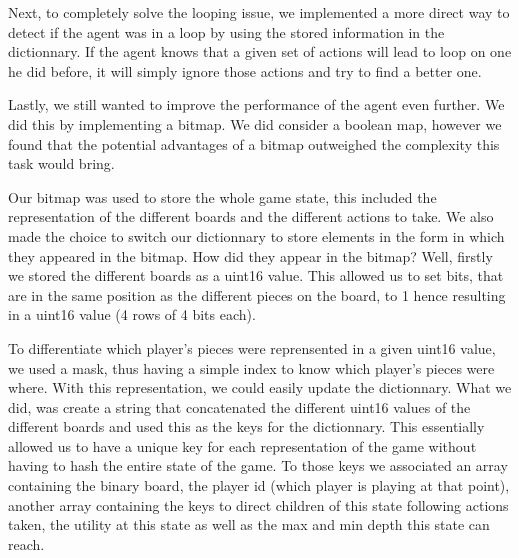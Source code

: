 \documentclass[11pt,a4paper]{report}
\begin{document}
\begin{answers}[21cm]
    Next, to completely solve the looping issue, we implemented a more direct way to detect if the agent was in a loop by using the 
    stored information in the dictionnary. If the agent knows that a given set of actions will lead to loop on one he did before,
    it will simply ignore those actions and try to find a better one. 

    Lastly, we still wanted to improve the performance of the agent even further. We did this by implementing a bitmap. 
    We did consider a boolean map, however we found that the potential advantages of a bitmap outweighed the complexity
    this task would bring. 

    Our bitmap was used to store the whole game state, this included the representation of the different boards and the 
    different actions to take. We also made the choice to switch our dictionnary to store elements in the form in which
    they appeared in the bitmap. How did they appear in the bitmap? Well, firstly we stored the different boards 
    as a uint16 value. This allowed us to set bits, that are in the same position as the different pieces on the board, to 1 hence resulting 
    in a uint16 value (4 rows of 4 bits each).  
\end{answers}

\begin{answers}[23cm]
    To differentiate which player's pieces were reprensented in a given uint16 value, we used a mask, thus having a simple 
    index to know which player's pieces were where. With this representation, we could easily update the dictionnary. 
    What we did, was create a string that concatenated the different uint16 values of the different boards and used this as the 
    keys for the dictionnary. This essentially allowed us to have a unique key for each representation of the game without 
    having to hash the entire state of the game. 
    To those keys we associated an array containing the binary board, the player id (which player is playing at that point),
    another array containing the keys to direct children of this state following actions taken, the utility at this state
    as well as the max and min depth this state can reach. 
\end{answers}

\begin{answers}[23cm]
\end{answers}
\end{document}

